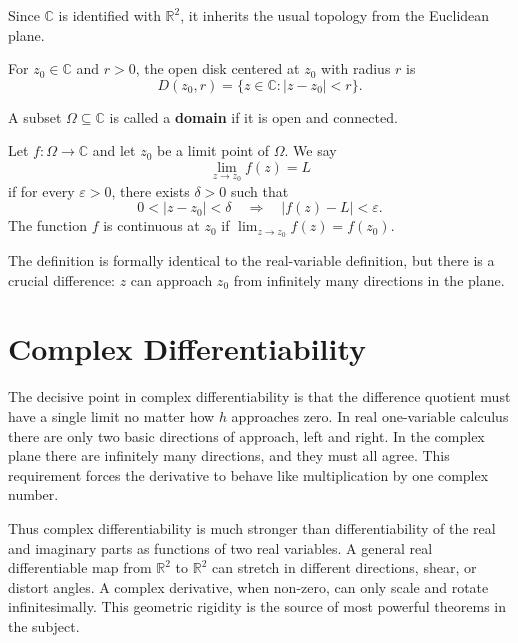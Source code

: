 Since $\mathbb{C}$ is identified with $\mathbb{R}^2$, it inherits the usual topology from the Euclidean plane.

\begin{definition}
For $z_0\in\mathbb{C}$ and $r>0$, the open disk centered at $z_0$ with radius $r$ is
\[
    D(z_0,r)=\{z\in\mathbb{C}:|z-z_0|<r\}.
\]
\end{definition}

\begin{definition}[Domain]
A subset $\Omega\subseteq\mathbb{C}$ is called a \textbf{domain} if it is open and connected.
\end{definition}

\begin{definition}
Let $f:\Omega\to\mathbb{C}$ and let $z_0$ be a limit point of $\Omega$. We say
\[
    \lim_{z\to z_0}f(z)=L
\]
if for every $\varepsilon>0$, there exists $\delta>0$ such that
\[
    0<|z-z_0|<\delta
    \quad\Longrightarrow\quad
    |f(z)-L|<\varepsilon.
\]
The function $f$ is continuous at $z_0$ if $\lim_{z\to z_0}f(z)=f(z_0)$.
\end{definition}

The definition is formally identical to the real-variable definition, but there is a crucial difference: $z$ can approach $z_0$ from infinitely many directions in the plane.

\section{Complex Differentiability}


The decisive point in complex differentiability is that the difference quotient must have a single limit no matter how $h$ approaches zero. In real one-variable calculus there are only two basic directions of approach, left and right. In the complex plane there are infinitely many directions, and they must all agree. This requirement forces the derivative to behave like multiplication by one complex number.

Thus complex differentiability is much stronger than differentiability of the real and imaginary parts as functions of two real variables. A general real differentiable map from $\mathbb{R}^2$ to $\mathbb{R}^2$ can stretch in different directions, shear, or distort angles. A complex derivative, when non-zero, can only scale and rotate infinitesimally. This geometric rigidity is the source of most powerful theorems in the subject.

